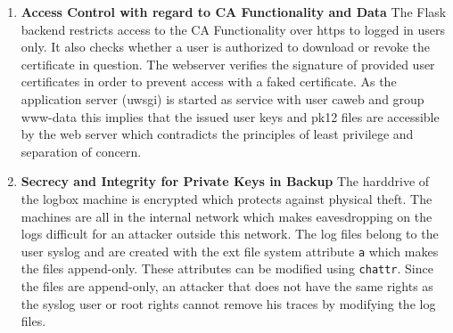 \documentclass[english]{article}
\begin{document}
\begin{enumerate}

\item \textbf{Access Control with regard to CA Functionality and Data}
The Flask backend restricts access to the CA Functionality over https to logged in users only. It also checks whether a user is authorized to download or revoke the certificate in question. The webserver verifies the signature of provided user certificates in order to prevent access with a faked certificate. As the application server (uwsgi) is started as service with user caweb and group www-data this implies that the issued user keys and pk12 files are accessible by the web server which contradicts the principles of least privilege and separation of concern.

\item \textbf{Secrecy and Integrity for Private Keys in Backup}
  The harddrive of the logbox machine is encrypted which protects against physical theft. The machines are all in the internal network which makes eavesdropping on the logs difficult for an attacker outside this network. The log files belong to the user syslog and are created with the ext file system attribute \texttt{a} which makes the files append-only. These attributes can be modified using \texttt{chattr}. Since the files are append-only, an attacker that does not have the same rights as the syslog user or root rights cannot remove his traces by modifying the log files.
  

\end{enumerate}
\end{document}
